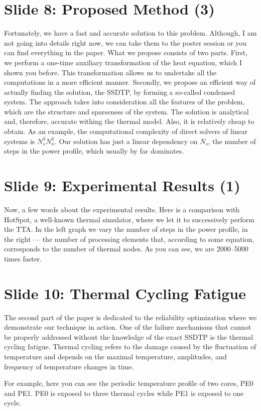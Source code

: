 \documentclass[11pt,a4paper]{article}
\begin{document}
\section{Slide 8: Proposed Method (3)}
Fortunately, we have a fast and accurate solution to this problem. Although, I am not going into details right now, we can take them to the poster session or you can find everything in the paper. What we propose consists of two parts. First, we perform a one-time auxiliary transformation of the heat equation, which I shown you before. This transformation allows us to undertake all the computations in a more efficient manner. Secondly, we propose an efficient way of actually finding the solution, the SSDTP, by forming a so-called condensed system. The approach takes into consideration all the features of the problem, which are the structure and sparseness of the system. The solution is analytical and, therefore, accurate withing the thermal model. Also, it is relatively cheap to obtain. As an example, the computational complexity of direct solvers of linear systems is $N_s^3 N_n^3$. Our solution has just a linear dependency on $N_s$, the number of steps in the power profile, which usually by far dominates.

\section{Slide 9: Experimental Results (1)}
Now, a few words about the experimental results. Here is a comparison with HotSpot, a well-known thermal simulator, where we let it to successively perform the TTA. In the left graph we vary the number of steps in the power profile, in the right --- the number of processing elements that, according to some equation, corresponds to the number of thermal nodes. As you can see, we are 2000--5000 times faster.

\section{Slide 10: Thermal Cycling Fatigue}
The second part of the paper is dedicated to the reliability optimization where we demonstrate our technique in action. One of the failure mechanisms that cannot be properly addressed without the knowledge of the exact SSDTP is the thermal cycling fatigue. Thermal cycling refers to the damage caused by the fluctuation of temperature and depends on the maximal temperature, amplitudes, and frequency of temperature changes in time.

For example, here you can see the periodic temperature profile of two cores, PE0 and PE1. PE0 is exposed to three thermal cycles while PE1 is exposed to one cycle.
\end{document}
